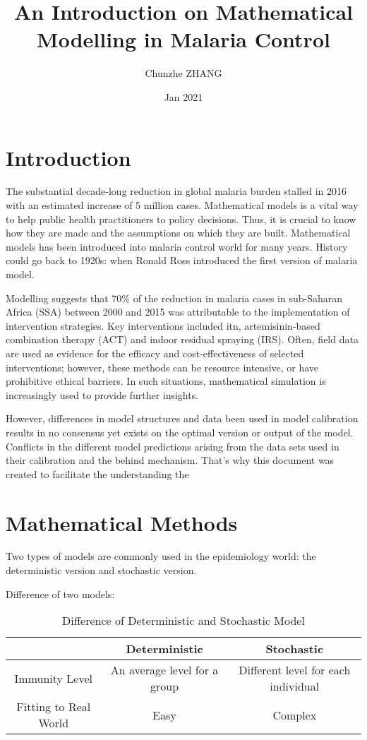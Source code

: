 \documentclass[a4paper, 12pt, twoside]{article}
\title{An Introduction on Mathematical Modelling in Malaria Control}
\author{Chunzhe ZHANG}
\date{Jan 2021}
\begin{document}
\begin{titlepage}
\maketitle
\end{titlepage}

\tableofcontents

\section{Introduction}
The substantial decade-long reduction in global malaria burden stalled in 2016 with an estimated increase of 5 million cases.
Mathematical models is a vital way to help public health practitioners to policy decisions.
Thus, it is crucial to know how they are made and the assumptions on which they are built.
Mathematical models has been introduced into malaria control world for many years.
History could go back to 1920s: when Ronald Ross introduced the first version of malaria model.

Modelling suggests that 70\% of the reduction in malaria cases in sub-Saharan Africa (SSA) between 2000 and 2015 was attributable to the implementation of intervention strategies.
Key interventions included \gls{itn}, artemisinin-based combination therapy (ACT) and indoor residual spraying (IRS).
Often, field data are used as evidence for the efficacy and cost-effectiveness of selected interventions; however, these methods can be resource intensive, or have prohibitive ethical barriers.
In such situations, mathematical simulation is increasingly used to provide further insights.

However, differences in model structures and data been used in model calibration results in no consensus yet exists on the optimal version or output of the model.
Conflicts in the different model predictions arising from the data sets used in their calibration and the behind mechanism. 
That's why this document was created to facilitate the understanding the 

\section{Mathematical Methods}

Two types of models are commonly used in the epidemiology world: the deterministic version and stochastic version.

Difference of two models:
\begin{table}[ht]
\centering
\label{tab:difference}
\begin{tabular}{c c c}
\toprule
 & Deterministic & Stochastic\\
\midrule
Immunity Level & An average level for a group & Different level for each individual \\
Fitting to Real World & Easy & Complex \\
\bottomrule
\end{tabular}
\caption{Difference of Deterministic and Stochastic Model}
\end{table}
\end{document}
